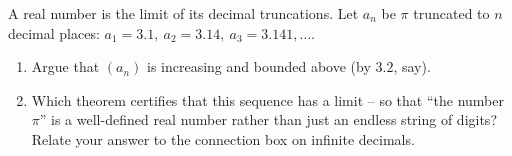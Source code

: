 \begin{exercise}
\label{ch28:exr-decimals}
A real number is the limit of its decimal truncations. Let $a_n$ be $\pi$
truncated to $n$ decimal places: $a_1 = 3.1,\ a_2 = 3.14,\ a_3 = 3.141, \dots$.
\begin{enumerate}[label=(\alph*)]
  \item Argue that $(a_n)$ is increasing and bounded above (by $3.2$, say).
  \item Which theorem certifies that this sequence has a limit -- so that ``the
        number $\pi$'' is a well-defined real number rather than just an endless
        string of digits? Relate your answer to the connection box on infinite
        decimals.
\end{enumerate}
\end{exercise}
